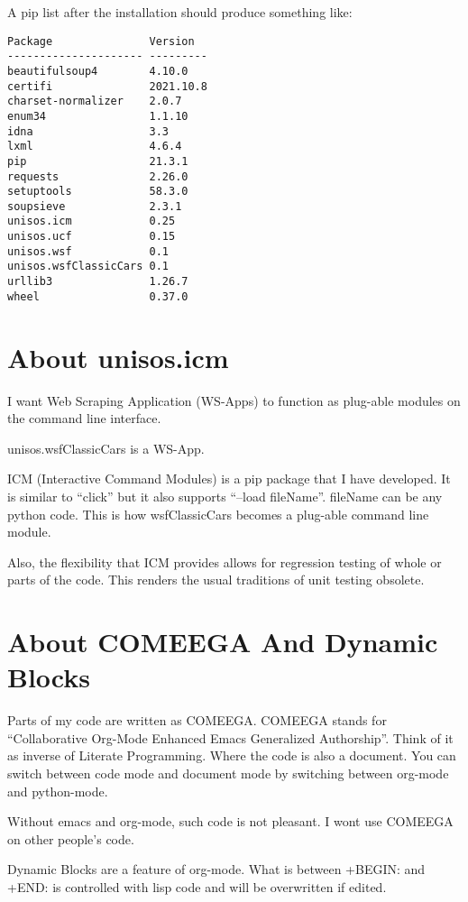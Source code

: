 \documentclass{article}
\begin{document}
A pip list after the installation should produce something like:

\begin{verbatim}
Package               Version
--------------------- ---------
beautifulsoup4        4.10.0
certifi               2021.10.8
charset-normalizer    2.0.7
enum34                1.1.10
idna                  3.3
lxml                  4.6.4
pip                   21.3.1
requests              2.26.0
setuptools            58.3.0
soupsieve             2.3.1
unisos.icm            0.25
unisos.ucf            0.15
unisos.wsf            0.1
unisos.wsfClassicCars 0.1
urllib3               1.26.7
wheel                 0.37.0
\end{verbatim}

\section{About unisos.icm}

I want Web Scraping Application (WS-Apps) to function as plug-able modules on the command line interface.

unisos.wsfClassicCars is a WS-App.

ICM (Interactive Command Modules) is a pip package that I have developed.
It is similar to ``click'' but it also supports ``--load fileName''.
fileName can be any python code. This is how wsfClassicCars becomes a plug-able command line module.

Also, the flexibility that ICM provides allows for regression testing of whole or parts of the code.
This renders the usual traditions of unit testing obsolete.

\section{About COMEEGA And Dynamic Blocks}

Parts of my code are written as COMEEGA.
COMEEGA stands for ``Collaborative Org-Mode Enhanced Emacs Generalized Authorship''.
Think of it as inverse of Literate Programming. Where the code is also a document.
You can switch between code mode and document mode by switching between org-mode and python-mode.

Without emacs and org-mode, such code is not pleasant.
I wont use COMEEGA on other people's code.

Dynamic Blocks are a feature of org-mode. What is between +BEGIN: and +END: is
controlled with lisp code and will be overwritten if edited.
\end{document}
